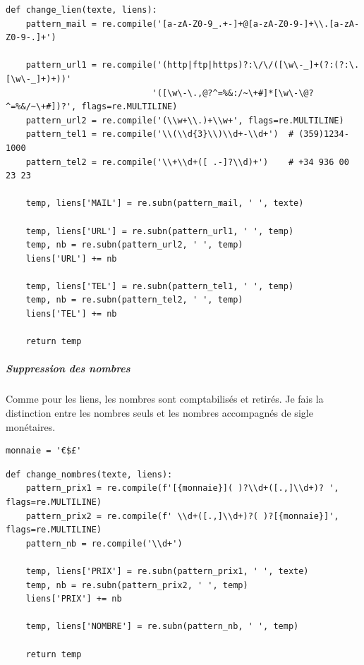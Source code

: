 \documentclass[a4paper,12pt]{article}
\begin{document}
					\begin{lstlisting}[title=Nettoyage des liens]
def change_lien(texte, liens):
    pattern_mail = re.compile('[a-zA-Z0-9_.+-]+@[a-zA-Z0-9-]+\\.[a-zA-Z0-9-.]+')

    pattern_url1 = re.compile('(http|ftp|https)?:\/\/([\w\-_]+(?:(?:\.[\w\-_]+)+))'
                             '([\w\-\.,@?^=%&:/~\+#]*[\w\-\@?^=%&/~\+#])?', flags=re.MULTILINE)
    pattern_url2 = re.compile('(\\w+\\.)+\\w+', flags=re.MULTILINE)
    pattern_tel1 = re.compile('\\(\\d{3}\\)\\d+-\\d+')  # (359)1234-1000
    pattern_tel2 = re.compile('\\+\\d+([ .-]?\\d)+')    # +34 936 00 23 23

    temp, liens['MAIL'] = re.subn(pattern_mail, ' ', texte)

    temp, liens['URL'] = re.subn(pattern_url1, ' ', temp)
    temp, nb = re.subn(pattern_url2, ' ', temp)
    liens['URL'] += nb

    temp, liens['TEL'] = re.subn(pattern_tel1, ' ', temp)
    temp, nb = re.subn(pattern_tel2, ' ', temp)
    liens['TEL'] += nb

    return temp \end{lstlisting}
 
 
				\subparagraph{Suppression des nombres} Comme pour les liens, les nombres sont comptabilisés et retirés. Je fais la distinction entre les nombres seuls et les nombres accompagnés de sigle monétaires. 
				
				\begin{verbatim}
monnaie = '€$£'
				\end{verbatim}
					\begin{lstlisting}[title=Nettoyage des nombres]
def change_nombres(texte, liens):
    pattern_prix1 = re.compile(f'[{monnaie}]( )?\\d+([.,]\\d+)? ', flags=re.MULTILINE)
    pattern_prix2 = re.compile(f' \\d+([.,]\\d+)?( )?[{monnaie}]', flags=re.MULTILINE)
    pattern_nb = re.compile('\\d+')

    temp, liens['PRIX'] = re.subn(pattern_prix1, ' ', texte)
    temp, nb = re.subn(pattern_prix2, ' ', temp)
    liens['PRIX'] += nb

    temp, liens['NOMBRE'] = re.subn(pattern_nb, ' ', temp)

    return temp \end{lstlisting}
 
\end{document}
